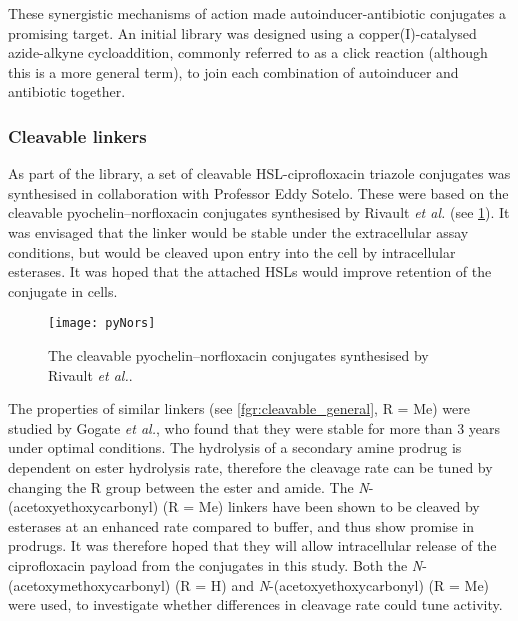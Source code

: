 These synergistic mechanisms of action made autoinducer-antibiotic conjugates a promising target. An initial library was designed using a copper(I)-catalysed azide-alkyne cycloaddition\cite{Tornoe2002,Rostovtsev2002}, commonly referred to as a click reaction (although this is a more general term), to join each combination of autoinducer and antibiotic together. 


\subsubsection{Cleavable linkers\label{sec:cleavable_intro}}

As part of the library, a set of cleavable HSL-ciprofloxacin triazole conjugates was synthesised in collaboration with Professor Eddy Sotelo.
These were based on the cleavable pyochelin–norfloxacin conjugates synthesised by Rivault \textit{et al.}\cite{Rivault2007} (see \ref{fgr:pyNors}).
It was envisaged that the linker would be stable under the extracellular assay conditions, but would be cleaved upon entry into the cell by intracellular esterases. It was hoped that the attached HSLs would improve retention of the conjugate in cells. 

\begin{figure}[H]
	\begin{center}
		\texttt{[image: pyNors]}
		\caption{The cleavable pyochelin–norfloxacin conjugates synthesised by Rivault \textit{et al.}\cite{Rivault2007}. \label{fgr:pyNors}}
	\end{center}
\end{figure}

The properties of similar linkers (see \ref{fgr:cleavable_general}, R = Me) were studied by Gogate \textit{et al.}, who found that they were stable for more than 3 years under optimal conditions\cite{Gogate1987}. 
The hydrolysis of a secondary amine prodrug is dependent on ester hydrolysis rate, therefore the cleavage rate can be tuned by changing the R group between the ester and amide\cite{Ortmann2005}. 
The \textit{N}-(acetoxyethoxycarbonyl) (R = Me) linkers have been shown to be cleaved by esterases at an enhanced rate compared to buffer, and thus show promise in prodrugs\cite{Gogate1987a}. It was therefore hoped that they will allow intracellular release of the ciprofloxacin  payload from the conjugates in this study. Both the \textit{N}-(acetoxymethoxycarbonyl) (R = H) and \textit{N}-(acetoxyethoxycarbonyl) (R = Me) were used, to investigate whether differences in cleavage rate could tune activity.

